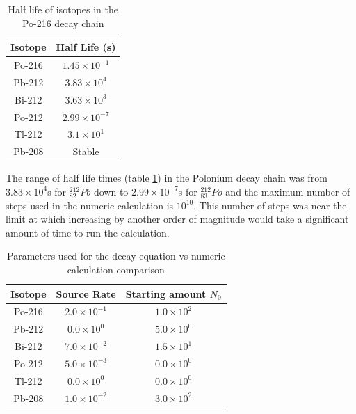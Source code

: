 \begin{table}[h]
\begin{center}
\begin{tabular}{c c}
\hline\hline
Isotope & Half Life (s)\\
\hline\hline
Po-216 & $1.45 \times 10^{-1}$ \\
Pb-212 & $3.83 \times 10^{4}$ \\
Bi-212 & $3.63 \times 10^{3}$ \\
Po-212 & $2.99 \times 10^{-7}$ \\
Tl-212 & $3.1 \times 10^{1}$ \\
Pb-208 & Stable \\
\hline\hline
\end{tabular}
\end{center}
\caption{Half life of isotopes in the Po-216 decay chain}
\label{table:po216halflives}
\end{table}

The range of half life times (table \ref{table:po216halflives}) in the Polonium decay chain was from $3.83 \times 10^4$s for ${}^{212}_{82}Pb$ down to $2.99 \times 10^{-7}$s for ${}^{212}_{83}Po$ and the maximum number of steps used in the numeric calculation is $10^{10}$.  This number of steps was near the limit at which increasing by another order of magnitude would take a significant amount of time to run the calculation. 

\begin{table}[h]
\begin{center}
\begin{tabular}{c c c}
\hline\hline
Isotope & Source Rate & Starting amount $N_0$ \\
\hline\hline
Po-216 & $2.0 \times 10^{-1}$ & $1.0 \times 10^{2}$ \\
Pb-212 & $0.0 \times 10^{0}$  & $5.0 \times 10^{0}$ \\
Bi-212 & $7.0 \times 10^{-2}$ & $1.5 \times 10^{1}$ \\
Po-212 & $5.0 \times 10^{-3}$ & $0.0 \times 10^{0}$ \\
Tl-212 & $0.0 \times 10^{0}$  & $0.0 \times 10^{0}$ \\
Pb-208 & $1.0 \times 10^{-2}$ & $3.0 \times 10^{2}$  \\
\hline\hline
\end{tabular}
\end{center}
\caption{Parameters used for the decay equation vs numeric calculation comparison}
\label{table:po216parameters}
\end{table}

